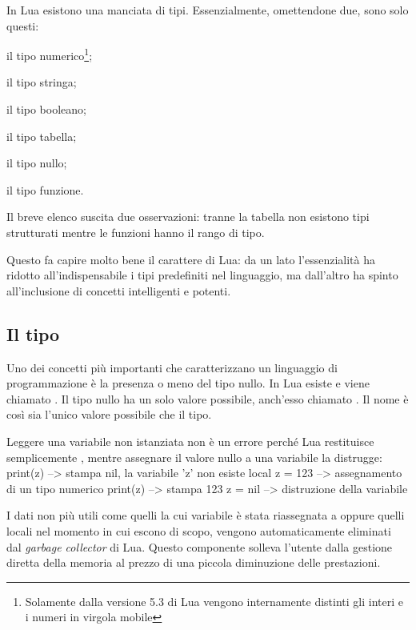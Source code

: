 In Lua esistono una manciata di tipi. Essenzialmente, omettendone due, sono solo
questi:
\begin{compactitemize}
\item {} il tipo numerico\footnote{Solamente dalla versione 5.3 di Lua
vengono internamente distinti gli interi e i numeri in virgola mobile};
\item {} il tipo stringa;
\item {} il tipo booleano;
\item {} il tipo tabella;
\item {} il tipo nullo;
\item {} il tipo funzione.
\end{compactitemize}

Il breve elenco suscita due osservazioni: tranne la tabella non esistono
tipi strutturati mentre le funzioni hanno il rango di tipo.

Questo fa capire molto bene il carattere di Lua: da un lato l'essenzialità ha
ridotto all'indispensabile i tipi predefiniti nel linguaggio, ma dall'altro ha
spinto all'inclusione di concetti intelligenti e potenti.


\subsection{Il tipo }

Uno dei concetti più importanti che caratterizzano un linguaggio di
programmazione è la presenza o meno del tipo nullo. In Lua esiste e viene
chiamato . Il tipo nullo ha un solo valore possibile, anch'esso
chiamato . Il nome è così sia l'unico valore possibile che il tipo.

Leggere una variabile non istanziata non è un errore perché Lua restituisce
semplicemente , mentre assegnare il valore nullo a una variabile la
distrugge:
\lines
print(z)      --> stampa nil, la variabile 'z' non esiste
local z = 123 --> assegnamento di un tipo numerico
print(z)      --> stampa 123
z = nil       --> distruzione della variabile
\endlines
{}

I dati non più utili come quelli la cui variabile è stata riassegnata a
 oppure quelli locali nel momento in cui escono di scopo, vengono
automaticamente eliminati dal \emph{garbage collector} di Lua. Questo componente
solleva l'utente dalla gestione diretta della memoria al prezzo di una piccola
diminuzione delle prestazioni.

